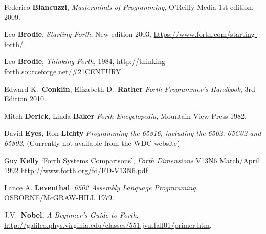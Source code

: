 \begin{thebibliography}{99}

        Federico \textbf{Biancuzzi},
  	\textit{Masterminds of Programming},
	O'Reilly Media
  	1st edition,
	2009.

        Leo \textbf{Brodie},
  	\textit{Starting Forth},
  	New edition 2003,
        \href{https://www.forth.com/starting-forth/}{https://www.forth.com/starting-forth/}

        Leo \textbf{Brodie},
  	\textit{Thinking Forth},
  	1984,
        \href{http://thinking-forth.sourceforge.net/\#21CENTURY}{http://thinking-forth.sourceforge.net/\#21CENTURY}

        Edward K.~\textbf{Conklin}, Elizabeth D.~\textbf{Rather}
  	\textit{Forth Programmer's Handbook},
  	3rd Edition
        2010.

        Mitch \textbf{Derick}, Linda \textbf{Baker}
  	\textit{Forth Encyclopedia},
        Mountain View Press
        1982.

        David \textbf{Eyes}, Ron \textbf{Lichty}
  	\textit{Programming the 65816, including the 6502, 65C02 and 65802},
        (Currently not available from the WDC website) 

        Guy \textbf{Kelly}
  	`Forth Systems Comparisons',
        \textit{Forth Dimensions} V13N6
        March/April 1992
        \href{http://www.forth.org/fd/FD-V13N6.pdf}{http://www.forth.org/fd/FD-V13N6.pdf}

        Lance A. \textbf{Leventhal},
  	\textit{6502 Assembly Language Programming},
	OSBORNE/McGRAW-HILL
	1979.

        J.V.~\textbf{Nobel},
  	\textit{A Beginner's Guide to Forth},
        \href{http://galileo.phys.virginia.edu/classes/551.jvn.fall01/primer.htm}{http://galileo.phys.virginia.edu/classes/551.jvn.fall01/primer.htm}.

\end{thebibliography}

